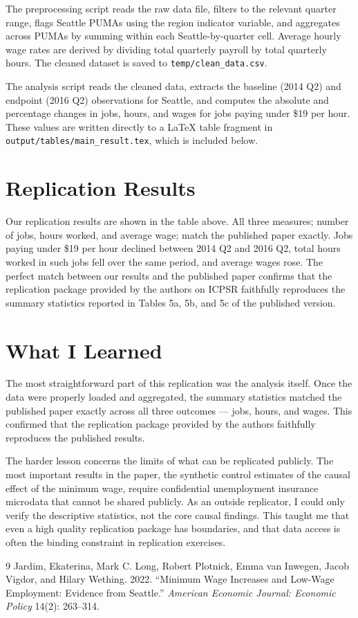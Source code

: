 \documentclass[12pt]{article}
\begin{document}
The preprocessing script reads the raw data file, filters to the relevant
quarter range, flags Seattle PUMAs using the region indicator variable, and
aggregates across PUMAs by summing within each Seattle-by-quarter cell.
Average hourly wage rates are derived by dividing total quarterly payroll by
total quarterly hours. The cleaned dataset is saved to \texttt{temp/clean\_data.csv}.

The analysis script reads the cleaned data, extracts the baseline (2014 Q2)
and endpoint (2016 Q2) observations for Seattle, and computes the absolute and
percentage changes in jobs, hours, and wages for jobs paying under \$19 per
hour. These values are written directly to a LaTeX table fragment in
\texttt{output/tables/main\_result.tex}, which is included below.

\section{Replication Results}



Our replication results are shown in the table above. All three measures;
number of jobs, hours worked, and average wage; match the published paper
exactly. Jobs paying under \$19 per hour declined between 2014 Q2 and 2016 Q2,
total hours worked in such jobs fell over the same period, and average wages
rose. The perfect match between our results and the published paper confirms
that the replication package provided by the authors on ICPSR faithfully
reproduces the summary statistics reported in Tables 5a, 5b, and 5c of the
published version.

\section{What I Learned}

The most straightforward part of this replication was the analysis itself.
Once the data were properly loaded and aggregated, the summary statistics
matched the published paper exactly across all three outcomes --- jobs, hours,
and wages. This confirmed that the replication package provided by the authors
faithfully reproduces the published results.

The harder lesson concerns the limits of what can be replicated publicly. The
most important results in the paper, the synthetic control estimates of the
causal effect of the minimum wage, require confidential unemployment
insurance microdata that cannot be shared publicly. As an outside replicator,
I could only verify the descriptive statistics, not the core causal findings.
This taught me that even a high quality replication package has boundaries, and
that data access is often the binding constraint in replication exercises.

\begin{thebibliography}{9}
Jardim, Ekaterina, Mark C. Long, Robert Plotnick, Emma van Inwegen, Jacob
Vigdor, and Hilary Wething. 2022. ``Minimum Wage Increases and Low-Wage
Employment: Evidence from Seattle.'' \textit{American Economic Journal:
Economic Policy} 14(2): 263--314.
\end{thebibliography}
\end{document}
